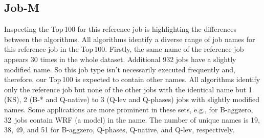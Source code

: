 \documentclass{jhps}
\begin{document}
%


\subsection{Job-M}

Inspecting the Top\,100 for this reference job is highlighting the differences between the algorithms.
All algorithms identify a diverse range of job names for this reference job in the Top\,100.
Firstly, the same name of the reference job appears 30 times in the whole dataset. 
Additional 932 jobs have a slightly modified name.
So this job type isn't necessarily executed frequently and, therefore, our Top\,100 is expected to contain other names.
All algorithms identify only the reference job but none of the other jobs with the identical name but 1 (KS), 2 (B-* and Q-native) to 3 (Q-lev and Q-phases) jobs with slightly modified names.
Some applications are more prominent in these sets, e.g., for B-aggzero, 32~jobs contain WRF (a model) in the name.
The number of unique names is 19, 38, 49, and 51 for B-aggzero, Q-phases, Q-native, and Q-lev, respectively.
\end{document}
